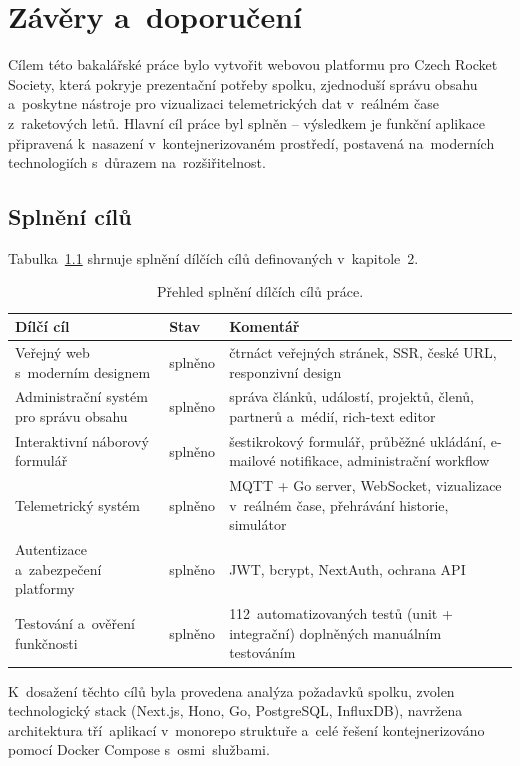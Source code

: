 \chapter{Závěry a~doporučení}
\label{chap:zaver}

Cílem této bakalářské práce bylo vytvořit webovou platformu pro Czech Rocket Society, která pokryje prezentační potřeby spolku, zjednoduší správu obsahu a~poskytne nástroje pro vizualizaci telemetrických dat v~reálném čase z~raketových letů. Hlavní cíl práce byl splněn -- výsledkem je funkční aplikace připravená k~nasazení v~kontejnerizovaném prostředí, postavená na~moderních technologiích s~důrazem na~rozšiřitelnost.

\section{Splnění cílů}

Tabulka~\ref{tab:cile} shrnuje splnění dílčích cílů definovaných v~kapitole~2.

\begin{table}[ht]
\centering
\small
\begin{tabular}{p{5.5cm}lp{5.5cm}}
\hline
\textbf{Dílčí cíl} & \textbf{Stav} & \textbf{Komentář} \\
\hline
Veřejný web s~moderním designem & splněno & čtrnáct veřejných stránek, SSR, české URL, responzivní design \\
Administrační systém pro správu obsahu & splněno & správa článků, událostí, projektů, členů, partnerů a~médií, rich-text editor \\
Interaktivní náborový formulář & splněno & šestikrokový formulář, průběžné ukládání, e-mailové notifikace, administrační workflow \\
Telemetrický systém & splněno & MQTT + Go server, WebSocket, vizualizace v~reálném čase, přehrávání historie, simulátor \\
Autentizace a~zabezpečení platformy & splněno & JWT, bcrypt, NextAuth, ochrana API \\
Testování a~ověření funkčnosti & splněno & 112~automatizovaných testů (unit + integrační) doplněných manuálním testováním \\
\hline
\end{tabular}
\caption{Přehled splnění dílčích cílů práce.}
\label{tab:cile}
\end{table}

K~dosažení těchto cílů byla provedena analýza požadavků spolku, zvolen technologický stack (Next.js, Hono, Go, PostgreSQL, InfluxDB), navržena architektura tří~aplikací v~monorepo struktuře a~celé řešení kontejnerizováno pomocí Docker Compose s~osmi~službami.

